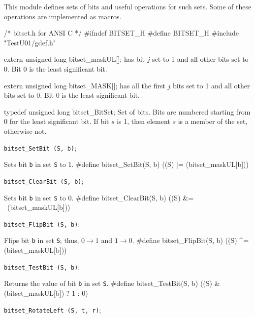 
This module defines sets of bits and useful operations for such sets.
Some of these operations are implemented as macros.

\code\hide
/* bitset.h  for ANSI C */
#ifndef BITSET_H
#define BITSET_H
#include "TestU01/gdef.h"
\endhide\endcode


\code

extern unsigned long bitset_maskUL[];
\endcode
  has bit $j$ set to 1 and all other bits set to
   0. Bit 0 is the least significant bit.
 \endtab
\code


extern unsigned long bitset_MASK[];
\endcode
  has all the first $j$ bits set to 1 and all other
  bits set to 0. Bit 0 is the least significant bit.
 \endtab


\code

typedef unsigned long bitset_BitSet;
\endcode
 \tab  Set of bits. Bits are numbered starting from 0 for the least
  significant bit. If bit $s$ is 1, then element $s$ is a member of
  the set, otherwise not.
 \endtab




\noindent
{\tt bitset\_SetBit (S, b)};

 \tab  Sets bit {\tt b} in set  {\tt S}  to 1.
 \endtab
\code
\hide
#define bitset_SetBit(S, b) ((S) |= (bitset_maskUL[b]))
\endhide
\endcode

\noindent
{\tt bitset\_ClearBit (S, b)};

 \tab  Sets bit {\tt b} in set  {\tt S}  to 0.
 \endtab
\code
\hide
#define bitset_ClearBit(S, b) ((S) &= ~(bitset_maskUL[b]))
\endhide
\endcode

\noindent
{\tt bitset\_FlipBit (S, b)};

 \tab  Flips bit {\tt b} in set {\tt S}; thus,
  $0 \rightarrow 1$ and $1 \rightarrow 0$.
 \endtab
\code
\hide
#define bitset_FlipBit(S, b) ((S) ^= (bitset_maskUL[b]))
\endhide
\endcode

\noindent
{\tt bitset\_TestBit (S, b)};

 \tab  Returns the value of bit {\tt b} in set {\tt S}.
 \endtab
\code
\hide
#define bitset_TestBit(S, b)  ((S) & (bitset_maskUL[b]) ? 1 : 0)
\endhide
\endcode

\noindent
{\tt bitset\_RotateLeft (S, t, r)};


